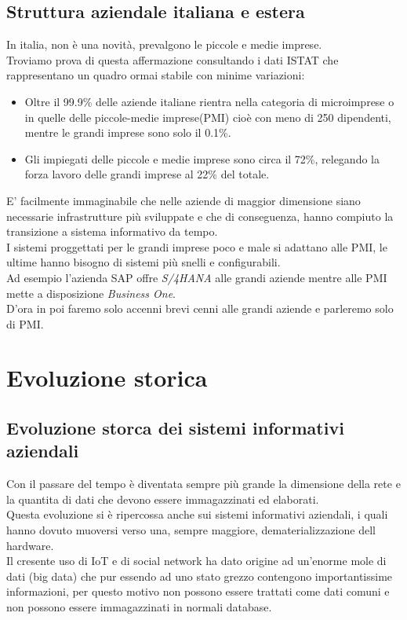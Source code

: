 \documentclass{book}
\begin{document}
    \subsection{Struttura aziendale italiana e estera}
    In italia, non è una novità, prevalgono le piccole e medie imprese.\\
    Troviamo prova di questa affermazione consultando i dati ISTAT che rappresentano un quadro ormai stabile con minime variazioni:
    \begin{itemize}
        \item Oltre il 99.9\% delle aziende italiane rientra nella categoria di microimprese o in quelle delle piccole-medie imprese(PMI) cioè con meno di 250 dipendenti, mentre le grandi imprese sono solo il 0.1\%.
        \item Gli impiegati delle piccole e medie imprese sono circa il 72\%, relegando la forza lavoro delle grandi imprese al 22\% del totale.
    \end{itemize}
    E' facilmente immaginabile che nelle aziende di maggior dimensione siano necessarie infrastrutture più sviluppate e che di conseguenza, hanno compiuto la transizione a sistema informativo da tempo.\\
    I sistemi proggettati per le grandi imprese poco e male si adattano alle PMI, le ultime hanno bisogno di sistemi più snelli e configurabili.\\
    Ad esempio l'azienda SAP offre \emph{S/4HANA} alle grandi aziende mentre alle PMI mette a disposizione \emph{Business One}.\\
    D'ora in poi faremo solo accenni brevi cenni alle grandi aziende e parleremo solo di PMI.
    \section{Evoluzione storica}
    \subsection{Evoluzione storca dei sistemi informativi aziendali}
    Con il passare del tempo è diventata sempre più grande la dimensione della rete e la quantita di dati che devono essere immagazzinati ed elaborati.\\
    Questa evoluzione si è ripercossa anche sui sistemi informativi aziendali, i quali hanno dovuto muoversi verso una, sempre maggiore, dematerializzazione dell hardware.\\
    Il cresente uso di IoT e di social network ha dato origine ad un'enorme mole di dati (big data) che pur essendo ad uno stato grezzo contengono importantissime informazioni, per questo motivo non possono essere trattati come dati comuni e non possono essere immagazzinati in normali database.
\end{document}
